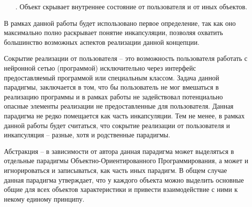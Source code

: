 {\begin{itemize}[leftmargin=2.15cm, labelwidth=0.65cm, labelsep=0.0cm]
	\item[\theitemcntr. ] Объект скрывает внутреннее состояние от пользователя и от иных объектов.
	\addtocounter{itemcntr}{1}
	
	\setcounter{itemcntr}{1}
\end{itemize}  

\par \redline В рамках данной работы будет использовано первое определение, так как оно максимально полно раскрывает понятие инкапсуляции, позволяя охватить большинство возможных аспектов реализации данной концепции.   

\par \redline Сокрытие реализации от пользователя {--} это возможность пользователя работать с нейронной сетью (программой) исключительно через интерфейс предоставляемый программой или специальным классом. Задача данной парадигмы, заключается в том, что бы пользователь не мог вмешаться в реализацию программы и в рамках работы не задействовал потенциально опасные элементы реализации не предоставленные для пользователя. Данная парадигма не редко помещается как часть инкапсуляции. Тем не менее, в рамках данной работы будет считаться, что сокрытие реализации от пользователя и инкапсуляция {--} разные, хотя и родственные парадигмы.

\par \redline Абстракция {--} в зависимости от автора данная парадигма может выделяться в отдельные парадигмы Объектно-Ориентированного Программирования, а может и игнорироваться и записываться, как часть иных парадигм. В общем случае данная парадигма утверждает, что у каждого объекта можно выделить основные общие для всех объектов характеристики и привести взаимодействие с ними к некому единому принципу.

\par \redline  

\par


}

\setcounter{subchaptercntr}{1}
\setcounter{formulacntr}{1}
\setcounter{imagecntr}{1}
\setcounter{tablecntr}{1}

